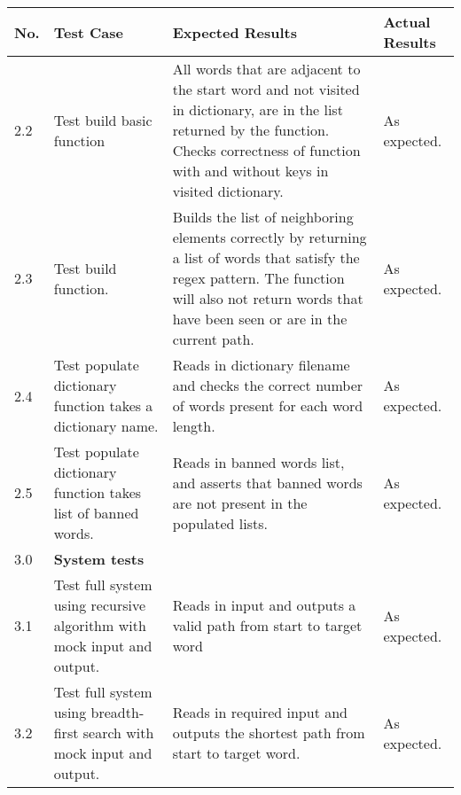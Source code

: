 \documentclass[12pt, a4]{report}
\begin{document}
	\begin{tabular}{ |p{0.5cm}|p{5cm}|p{5cm}|p{5cm}| } 
		\hline
		No. & Test Case & Expected Results & Actual Results \\
		\hline
		2.2 & Test build basic function & All words that are adjacent to the start word and not visited in dictionary, are in the list returned by the function. Checks correctness of function with and without keys in visited dictionary. & As expected. \\
		2.3 & Test build function. & Builds the list of neighboring elements correctly by returning a list of words that satisfy the regex pattern. The function will also not return words that have been seen or are in the current path.  & As expected.\\
		2.4 & Test populate dictionary function takes a dictionary name. & Reads in dictionary filename and checks the correct number of words present for each word length. & As expected. \\
		2.5 & Test populate dictionary function takes list of banned words. & Reads in banned words list, and asserts that banned words are not present in the populated lists. & As expected. \\
		3.0 & \textbf{System tests} &  &  \\
		3.1 & Test full system using recursive algorithm with mock input and output. & Reads in input and outputs a valid path from start to target word & As expected. \\
		3.2 & Test full system using breadth-first search with mock input and output. & Reads in required input and outputs the shortest path from start to target word. & As expected. \\
		\hline
	\end{tabular}
	\newpage
\end{document}
